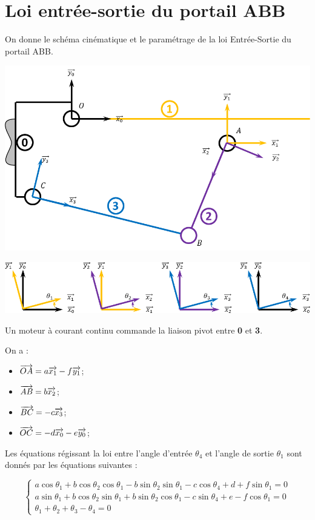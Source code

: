 \documentclass[10pt,fleqn]{article} %
\begin{document}



\section{Loi entrée-sortie du portail ABB}
On donne le schéma cinématique et le paramétrage de la loi Entrée-Sortie du portail ABB.

\begin{center}
\includegraphics[width=.7\linewidth]{images/Schema}

\includegraphics[width=\linewidth]{images/Parametrage}
\end{center}

Un moteur à courant continu commande la liaison pivot entre \textbf{0} et \textbf{3}.  


On a : 
\begin{multicols}{2}
\begin{itemize}
\item $\overrightarrow{OA} = a \overrightarrow{x_{1}}-f \overrightarrow{y_{1}}$;
\item $\overrightarrow{AB} = b \overrightarrow{x_{2}}$;
\item $\overrightarrow{BC} = -c \overrightarrow{x_{3}}$;
\item $\overrightarrow{OC} = -d \overrightarrow{x_{0}}-e\overrightarrow{y_{0}}$;
\end{itemize}
\end{multicols}
 
Les équations régissant la loi entre l'angle d'entrée $\theta_4$ et l'angle de sortie $\theta_1$ sont donnés par les équations suivantes : 

$$
\left\{
\begin{array}{l}
a \cos \theta_1 + b\cos \theta_2 \cos \theta_1 
-b \sin\theta_2 \sin\theta_1 - c \cos \theta_4  
+d 
+f\sin \theta_1 
 =0  \\
a \sin\theta_1 + b\cos \theta_2 \sin\theta_1 + b\sin\theta_2 \cos \theta_1  
- c \sin\theta_4 +e 
-f\cos \theta_1 = 0  \\
\theta_1 +\theta_2 + \theta_3 - \theta_4 = 0
\end{array}
\right.
$$
\end{document}
